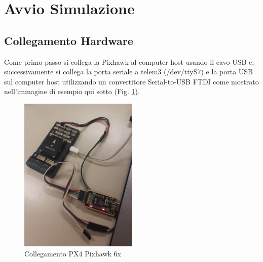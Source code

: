 \section{Avvio Simulazione}
\subsection{Collegamento Hardware}
Come primo passo si collega la Pixhawk al computer host usando il cavo USB c, successivamente si collega la porta seriale a telem3 (/dev/ttyS7) e la porta USB sul computer host utilizzando un convertitore Serial-to-USB FTDI come mostrato nell'immagine di esempio qui sotto (Fig. \ref{fig:Collegamento PX4 Pixhawk 6x}).
\begin{figure}[H] %
  \centering
  \includegraphics[width=0.5\textwidth]{files/images/collegamento_px4.png} %
  \caption{Collegamento PX4 Pixhawk 6x} %
  \label{fig:Collegamento PX4 Pixhawk 6x} %
\end{figure}
\noindent


